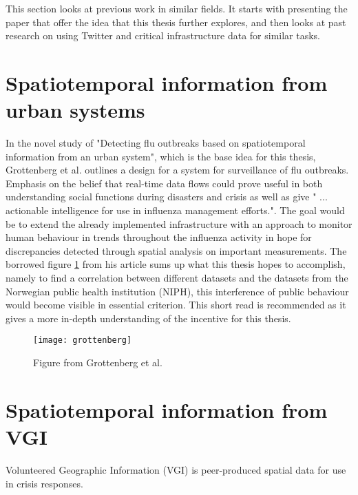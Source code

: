 This section looks at previous work in similar fields. It starts with presenting the paper that offer the idea that this thesis further explores, and then looks at past research on using Twitter and critical infrastructure data for similar tasks.

\section{Spatiotemporal information from urban systems}
In the novel study of "Detecting flu outbreaks based on spatiotemporal information from an urban system", which is the base idea for this thesis, Grottenberg et al. \cite{spatiotemp_urban_sys} outlines a design for a system for surveillance of flu outbreaks. Emphasis on the belief that real-time data flows could prove useful in both understanding social functions during disasters and crisis as well as give " ... actionable intelligence for use in influenza management efforts.". The goal would be to extend the already implemented infrastructure with an approach to monitor human behaviour in trends throughout the influenza activity in hope for discrepancies detected through spatial analysis on important measurements. The borrowed figure \ref{fig:grottenberg} from his article sums up what this thesis hopes to accomplish, namely to find a correlation between different datasets and the datasets from the Norwegian public health institution (NIPH), this interference of public behaviour would become visible in essential criterion.
This short read \cite{spatiotemp_urban_sys} is recommended as it gives a more in-depth understanding of the incentive for this thesis.

\begin{figure}[h]
\texttt{[image: grottenberg]}
\centering
\caption{Figure from Grottenberg et al. \cite{spatiotemp_urban_sys}}
\label{fig:grottenberg}
\end{figure}


\section{Spatiotemporal information from VGI}
Volunteered Geographic Information (VGI) is peer-produced spatial data for use in crisis responses.


